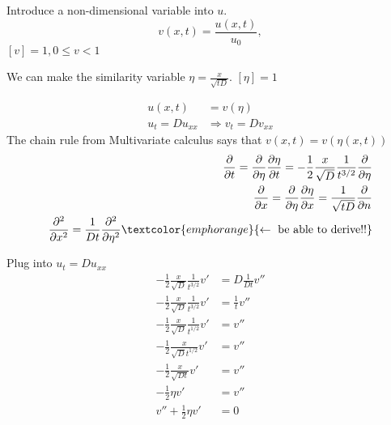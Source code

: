 \documentclass[
	date={September 4{,} 2024}
]{math486notes}
\begin{document}
Introduce a non-dimensional variable into $u$.
\[ v(x, t) = \frac{u(x,t)}{u_{0}}, \]
$[v] = 1, 0 \leq v < 1$

We can make the similarity variable $\eta = \frac{x}{\sqrt{tD}}$.
$[\eta]=1$

\begin{equation*}
\begin{aligned}
	u(x,t) &= v(\eta)\\
	u_{t} = Du_{xx} &\Rightarrow v_{t} = Dv_{xx}
\end{aligned}
\end{equation*}
The chain rule from Multivariate calculus says that $v(x,t) = v(\eta(x, t))$
\begin{equation*}
\begin{aligned}
	\frac{\partial}{\partial t} = \frac{\partial}{\partial \eta}\frac{\partial \eta}{\partial t} = -\frac{1}{2}\frac{x}{\sqrt{D}}\frac{1}{t^{3/2}}\frac{\partial}{\partial \eta}\\
	\frac{\partial}{\partial x} = \frac{\partial}{\partial \eta}\frac{\partial \eta}{\partial x} = \frac{1}{\sqrt{tD}}\frac{\partial}{\partial n}\\
	\frac{\partial^{2}}{\partial x^{2}} = \frac{1}{Dt}\frac{\partial^{2}}{\partial \eta^{2}} \textcolor{emphorange}{\leftarrow \mbox{ be able to derive!!}} %
\end{aligned}
\end{equation*}

Plug into $u_{t} = Du_{xx}$
\begin{equation*}
\begin{aligned}
	-\frac{1}{2}\frac{x}{\sqrt{D}}\frac{1}{t^{3/2}}v' &= D\frac{1}{Dt}v''\\
	-\frac{1}{2}\frac{x}{\sqrt{D}}\frac{1}{t^{3/2}}v' &= \frac{1}{t}v''\\
	-\frac{1}{2}\frac{x}{\sqrt{D}}\frac{1}{t^{1/2}}v' &= v''\\
	-\frac{1}{2}\frac{x}{\sqrt{D}t^{1/2}}v' &= v''\\
	-\frac{1}{2}\frac{x}{\sqrt{Dt}}v' &= v''\\
	-\frac{1}{2}\eta v' &= v''\\
	v'' + \frac{1}{2}\eta v' &= 0\\
\end{aligned}
\end{equation*}
\end{document}
